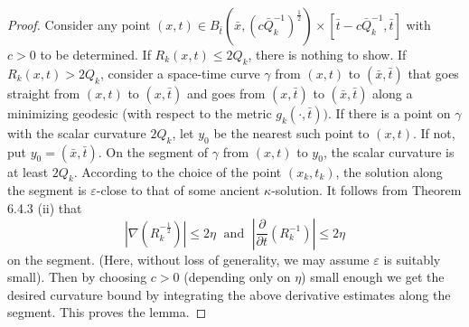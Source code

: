 \begin{proof}
Consider any point $(x,t)\in B_{\bar{t}}(\bar{x},
(c\bar{Q}_k^{-1})^{\frac{1}{2}})\times
[\bar{t}-c\bar{Q}_k^{-1},\bar{t}]$ with $c>0$ to be determined. If
$R_k(x,t)\leq 2Q_k$, there is nothing to show. If $R_k(x,t)>
2Q_k$, consider a space-time curve $\gamma$ from $(x,t)$ to
$(\bar{x},\bar{t})$ that goes straight from $(x,t)$ to
$(x,\bar{t})$ and goes from $(x,\bar{t})$ to $(\bar{x},\bar{t})$
along a minimizing geodesic (with respect to the metric
$g_k(\cdot,\bar{t}))$. If there is a point on $\gamma$ with the
scalar curvature $2Q_k$, let $y_0$ be the nearest such point to
$(x,t)$. If not, put $y_0=(\bar{x},\bar{t}).$ On the segment of
$\gamma$ from $(x,t)$ to $y_0$, the scalar curvature is at least
$2Q_k$. According to the choice of the point $(x_k,t_k)$, the
solution along the segment is $\varepsilon$-close to that of some
ancient $\kappa$-solution. It follows from Theorem 6.4.3 (ii) that
$$
|\nabla(R_k^{-\frac{1}{2}})|\leq 2\eta \; \mbox{ and } \;
\left|\frac{\partial}{\partial t}(R_k^{-1})\right|\leq 2\eta
$$
on the segment. (Here, without loss of generality, we may assume
$\varepsilon$ is suitably small). Then by choosing $c>0$
(depending only on $\eta$) small enough we get the desired
curvature bound by integrating the above derivative estimates
along the segment. This proves the lemma.
\end{proof}
